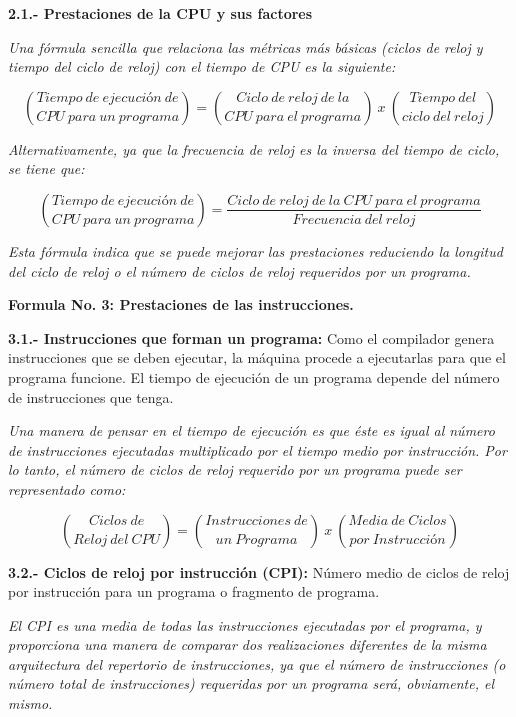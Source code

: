 \documentclass{article}
\begin{document}
\quad

\textbf{2.1.- Prestaciones de la CPU y sus factores}

\quad 

\textit{Una fórmula sencilla que relaciona las métricas más básicas (ciclos de reloj y tiempo del ciclo de reloj) con el tiempo de CPU es la siguiente:}

\[\binom{Tiempo\ de\ ejecución\ de}{CPU\ para\ un\ programa}= \binom{Ciclo\ de\ reloj\ de\ la}{CPU\ para\ el\ programa}\ x\ \binom{Tiempo\ del}{ciclo\ del\ reloj}\]

\quad

\textit{Alternativamente, ya que la frecuencia de reloj es la inversa del tiempo de ciclo, se tiene que:}

\[\binom{Tiempo\ de\ ejecución\ de}{CPU\ para\ un\ programa}= \frac{Ciclo\ de\ reloj\ de\ la\ CPU\ para\ el\ programa}{Frecuencia\ del\ reloj}\]

\quad

\textit{Esta fórmula indica que se puede mejorar las prestaciones reduciendo la longitud del ciclo de reloj o el número de ciclos de reloj requeridos por un programa.}

\quad

\textbf{Formula No. 3: Prestaciones de las instrucciones.}

\quad

\textbf{3.1.- Instrucciones que forman un programa:}{ Como el compilador genera instrucciones que se deben ejecutar, la máquina procede a ejecutarlas para que el programa funcione. El tiempo de ejecución de un programa depende del número de instrucciones que tenga. }

\quad

\textit{Una manera de pensar en el tiempo de ejecución es que éste es igual al número de instrucciones ejecutadas multiplicado por el tiempo medio por instrucción. Por lo tanto, el número de ciclos de reloj requerido por un programa puede ser representado como:}

\[\binom{Ciclos\ de}{Reloj\ del\ CPU}= \binom{Instrucciones\ de}{un\ Programa}\ x\ \binom{Media\ de\ Ciclos}{por\ Instrucción}\]

\quad

\textbf{3.2.- Ciclos de reloj por instrucción (CPI):}{ Número medio de ciclos de reloj por instrucción para un programa o fragmento de programa.}

\quad

\textit{El CPI es una media de todas las instrucciones ejecutadas por el programa, y proporciona una manera de comparar dos realizaciones diferentes de la misma arquitectura del repertorio de instrucciones, ya que el número de instrucciones (o número total de instrucciones) requeridas por un programa será, obviamente, el mismo.}
\end{document}
